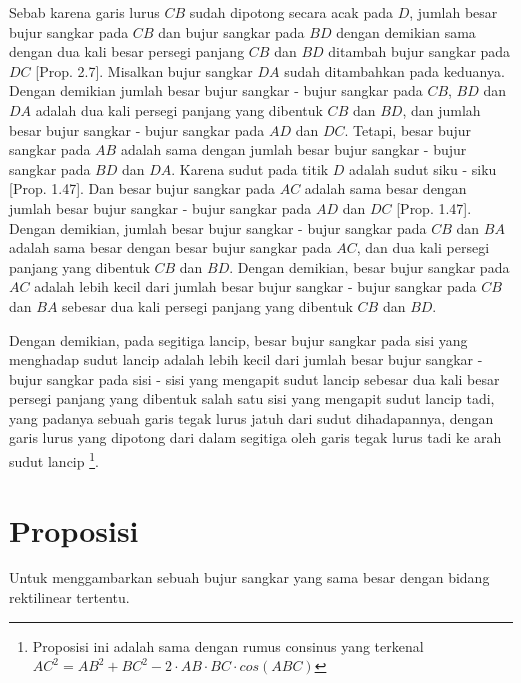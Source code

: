 \documentclass[a4paper]{book}
\begin{document}
Sebab karena garis lurus $CB$ sudah dipotong secara acak pada $D$, jumlah 
besar bujur sangkar pada $CB$ dan bujur sangkar pada $BD$ dengan demikian
sama dengan dua kali besar persegi panjang $CB$ dan $BD$ ditambah  bujur 
sangkar pada $DC$ [Prop. 2.7]. Misalkan bujur sangkar $DA$ sudah ditambahkan
pada keduanya. Dengan demikian jumlah besar bujur sangkar - bujur sangkar pada
$CB$, $BD$ dan $DA$ adalah dua kali persegi panjang yang dibentuk $CB$ dan 
$BD$, dan jumlah besar bujur sangkar - bujur sangkar pada $AD$ dan $DC$. 
Tetapi, besar bujur sangkar pada $AB$ adalah sama dengan jumlah besar bujur
sangkar - bujur sangkar pada $BD$ dan $DA$. Karena sudut pada titik $D$ adalah
sudut siku - siku [Prop. 1.47]. Dan besar bujur sangkar pada $AC$ adalah
sama besar dengan jumlah besar bujur sangkar - bujur sangkar pada $AD$ dan 
$DC$ [Prop. 1.47]. Dengan demikian, jumlah besar bujur sangkar - bujur sangkar
pada $CB$ dan $BA$ adalah sama besar dengan besar bujur sangkar pada $AC$, dan
dua kali persegi panjang yang dibentuk $CB$ dan $BD$. Dengan demikian, besar
bujur sangkar pada $AC$ adalah lebih kecil dari jumlah besar bujur sangkar 
- bujur sangkar pada $CB$ dan $BA$ sebesar dua kali persegi panjang yang
dibentuk $CB$ dan $BD$.

Dengan demikian, pada segitiga lancip, besar bujur sangkar pada sisi yang
menghadap sudut lancip adalah lebih kecil dari jumlah besar bujur sangkar - 
bujur sangkar pada sisi - sisi yang mengapit sudut lancip sebesar dua kali
besar persegi panjang yang dibentuk salah satu sisi yang mengapit sudut
lancip tadi, yang padanya sebuah garis tegak lurus jatuh dari sudut 
dihadapannya, dengan garis lurus yang dipotong dari dalam segitiga oleh garis
tegak lurus tadi ke arah sudut lancip \footnote{Proposisi ini adalah sama 
dengan rumus consinus yang terkenal 
$AC^2 = AB^2 + BC^2 - 2\cdot AB\cdot BC\cdot cos(ABC)$}.


\section*{\centering Proposisi \thesection} 
Untuk menggambarkan sebuah bujur sangkar yang  sama besar dengan bidang 
rektilinear tertentu.
\end{document}
